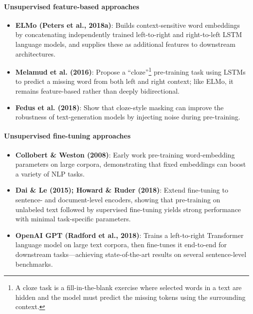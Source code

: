 \documentclass[10pt]{article}
\begin{document}
\paragraph{Unsupervised feature-based approaches}
\begin{itemize}
    \item \textbf{ELMo (Peters et al., 2018a)}\cite{DBLP:journals/corr/abs-1802-05365}: Builds context-sensitive word embeddings by concatenating independently trained left-to-right and right-to-left LSTM language models, and supplies these as additional features to downstream architectures.
    \item \textbf{Melamud et al. (2016)}\cite{melamud-etal-2016-context2vec}: Propose a ``cloze''\footnote{A cloze task is a fill-in-the-blank exercise where selected words in a text are hidden and the model must predict the missing tokens using the surrounding context.} pre-training task using LSTMs to predict a missing word from both left and right context; like ELMo, it remains feature-based rather than deeply bidirectional.
    \item \textbf{Fedus et al. (2018)}\cite{fedus2018maskganbettertextgeneration}: Show that cloze-style masking can improve the robustness of text-generation models by injecting noise during pre-training.
\end{itemize}

\paragraph{Unsupervised fine-tuning approaches}
\begin{itemize}
    \item \textbf{Collobert \& Weston (2008)}\cite{10.1145/1390156.1390177}: Early work pre-training word-embedding parameters on large corpora, demonstrating that fixed embeddings can boost a variety of NLP tasks.
    \item \textbf{Dai \& Le (2015); Howard \& Ruder (2018)}\cite{NIPS2015_7137debd}: Extend fine-tuning to sentence- and document-level encoders, showing that pre-training on unlabeled text followed by supervised fine-tuning yields strong performance with minimal task-specific parameters.
    \item \textbf{OpenAI GPT (Radford et al., 2018)}\cite{radford2018improving}: Trains a left-to-right Transformer language model on large text corpora, then fine-tunes it end-to-end for downstream tasks—achieving state-of-the-art results on several sentence-level benchmarks.
\end{itemize}
\end{document}
